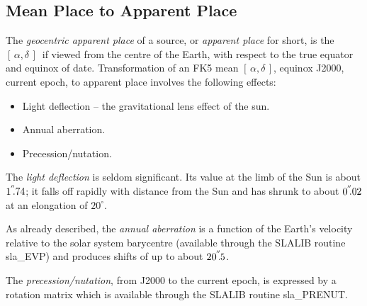 \documentclass[11pt,twoside]{article}
\newcommand{\radec}     {$[\,\alpha,\delta\,]$}
\newcommand{\arcsec}[2] {\arcseci{#1}$\hspace{-0.4em}.#2$}
\newcommand{\arcsec}[2] {
      {$#1\hspace{-0.05em}^{'\hspace{-0.1em}'}\hspace{-0.4em}.#2$}
   }
\newcommand{\arcseci}[1] {$#1\hspace{-0.05em}$\raisebox{-0.5ex}
                         {$^{'\hspace{-0.1em}'}$}}
\renewcommand{\arcseci}[1] {$#1\hspace{-0.05em}^{'\hspace{-0.1em}'}$}
\begin{document}
\subsection {Mean Place to Apparent Place}
The {\it geocentric apparent place}\/ of a source, or {\it apparent place}\/
for short,
is the \radec\ if viewed from the centre of the Earth,
with respect to the true equator and equinox of date.
Transformation of an FK5 mean \radec, equinox J2000,
current epoch, to apparent place involves the following effects:
\goodbreak
\begin{itemize}
   \item Light deflection -- the gravitational lens effect of
         the sun.
   \item Annual aberration.
   \item Precession/nutation.
\end{itemize}
The {\it light deflection}\/ is seldom significant.  Its value
at the limb of the Sun is about
\arcsec{1}{74};  it falls off rapidly with distance from the
Sun and has shrunk to about
\arcsec{0}{02} at an elongation of $20^\circ$.

As already described, the {\it annual aberration}\/
is a function of the Earth's velocity
relative to the solar system barycentre (available through the
SLALIB routine
sla\_EVP)
and produces shifts of up to about \arcsec{20}{5}.

The {\it precession/nutation}, from J2000 to the current epoch, is
expressed by a rotation matrix which is available through the
SLALIB routine
sla\_PRENUT.
\end{document}
